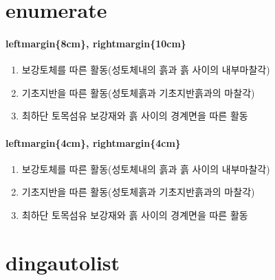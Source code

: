 \documentclass[12pt, a4paper, oneside]{book}
\let\stdsection\section
\renewcommand\section{\newpage\stdsection}
\begin{document}
		

	\section{enumerate}


		\paragraph{ leftmargin\{8cm\}, rightmargin\{10cm\} } 
			\begin{enumerate}
			\setlength\leftmargin{8cm}
			\setlength\rightmargin{10cm}
			\item	보강토체를 따른 활동(성토체내의 흙과 흙 사이의 내부마찰각) 
			\item	기초지반을 따른 활동(성토체흙과 기초지반흙과의 마찰각) 
			\item	최하단 토목섬유 보강재와 흙 사이의 경계면을 따른 활동 
			\end{enumerate}
	
		\paragraph{ leftmargin\{4cm\}, rightmargin\{4cm\} } 
			\begin{enumerate}	[
							leftmargin=4cm, 
							rightmargin=4cm
							]
			\item	보강토체를 따른 활동(성토체내의 흙과 흙 사이의 내부마찰각) 
			\item	기초지반을 따른 활동(성토체흙과 기초지반흙과의 마찰각) 
			\item	최하단 토목섬유 보강재와 흙 사이의 경계면을 따른 활동 
			\end{enumerate}




	\section{dingautolist}
\end{document}
